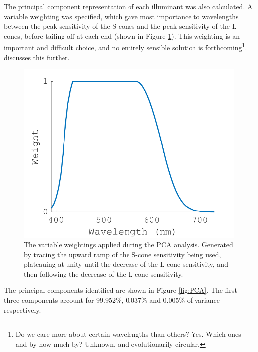 The principal component representation of each illuminant was also calculated. A variable weighting was specified, which gave most importance to wavelengths between the peak sensitivity of the S-cones and the peak sensitivity of the L-cones, before tailing off at each end (shown in Figure \ref{fig:VW}). This weighting is an important and difficult choice, and no entirely sensible solution is forthcoming\footnote{Do we care more about certain wavelengths than others? Yes. Which ones and by how much by? Unknown, and evolutionarily circular.}. \citet{maloney_evaluation_1986} discusses this further. %

\begin{figure}[htbp]
 \includegraphics[max width=\textwidth]{figs/comp/melcomp_3/vw.png}
 \caption{The variable weightings applied during the \gls{PCA} analysis. Generated by tracing the upward ramp of the S-cone sensitivity being used, plateauing at unity until the decrease of the L-cone sensitivity, and then following the decrease of the L-cone sensitivity.}
 \label{fig:VW}
\end{figure} 

The principal components identified are shown in Figure \ref{fig:PCA}. The first three components account for 99.952\%, 0.037\% and 0.005\% of variance respectively.

